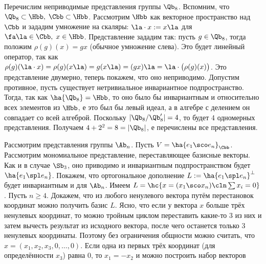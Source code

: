 \documentclass[a4paper]{article}
\begin{document}
Перечислим неприводимые представления группы $\Qb_8$. Вспомним, что $\Qb_8 \subset \Hbb, \; \Cbb \subset
\Hbb$.  Рассмотрим $\Hbb$ как векторное пространство над $\Cbb$ и зададим умножение на скаляры: $\la
\cdot x := x\la$ для $\fa \la \in \Cbb, \; x \in \Hbb$. Представление зададим так: пусть $g \in
\Qb_8$, тогда положим $\rho(g)(x)=gx$ (обычное умножение слева). Это будет линейный оператор, так как
$\rho(g)(\la \cdot x) = \rho(g)(x\la)=g(x\la)=(gx)\la = \la \cdot
\bigl(\rho(g)(x)\bigr)$. Это представление двумерно, теперь покажем, что оно неприводимо. Допустим противное,
пусть существует нетривиальное инвариантное подпространство. Тогда, так как $\ha{\Qb_8}=\Hbb$, то оно было бы
инвариантным и относительно всех элементов из $\Hbb$, е это был бы левый идеал, а в алгебре с делением он
совпадает со всей алгеброй. Поскольку $|\Qb_8/\Qb_8'|=4$, то будет 4 одномерных представления. Получаем
$4+2^2=8=|\Qb_8|$, е перечислены все представления.

Рассмотрим представления группы $\Ab_n$. Пусть $V=\ha{e_1 \sco e_n}_\Cbb$. Рассмотрим мономиальное
представление, переставляющее базисные векторы. Как и в случае $\Sb_3$, оно приводимо и инвариантным
подпространством будет $\ha{e_1  \spl  e_n}$. Покажем, что ортогональное дополнение $L:=\ha{e_1  \spl
e_n}^\bot$ будет инвариантным и для $\Ab_n$. Имеем $L=\hc{x=(x_1 \sco x_n)\cln \sum x_i=0}$. Пусть $n \ge 4$.
Докажем, что из любого ненулевого вектора путём перестановок координат можно получить базис $L$. Ясно, что
если у вектора $x$ больше трёх ненулевых координат, то можно тройным циклом переставить какие-то 3 из них и
затем вычесть результат из исходного вектора, после чего останется только 3 ненулевых координаты. Поэтому без
ограничения общности можно считать, что $x=(x_1,x_2,x_3,0,\ldots,0)$. Если одна из первых трёх координат (для
определённости $x_3$) равна 0, то $x_1=-x_2$ и можно построить набор векторов
\end{document}
